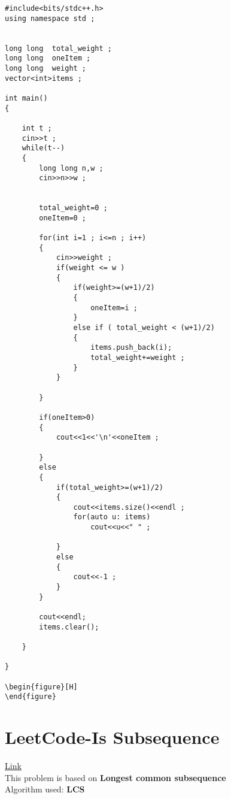 \documentclass{article}
\begin{document}
\begin{lstlisting}[style=cppStyle]
#include<bits/stdc++.h>
using namespace std ;


long long  total_weight ;
long long  oneItem ;
long long  weight ;
vector<int>items ;

int main()
{

    int t ;
    cin>>t ;
    while(t--)
    {
        long long n,w ;
        cin>>n>>w ;


        total_weight=0 ;
        oneItem=0 ;

        for(int i=1 ; i<=n ; i++)
        {
            cin>>weight ;
            if(weight <= w )
            {
                if(weight>=(w+1)/2)
                {
                    oneItem=i ;
                }
                else if ( total_weight < (w+1)/2)
                {
                    items.push_back(i);
                    total_weight+=weight ;
                }
            }

        }

        if(oneItem>0)
        {
            cout<<1<<'\n'<<oneItem ;

        }
        else
        {
            if(total_weight>=(w+1)/2)
            {
                cout<<items.size()<<endl ;
                for(auto u: items)
                    cout<<u<<" " ;

            }
            else
            {
                cout<<-1 ;
            }
        }

        cout<<endl;
        items.clear();

    }

}

\begin{figure}[H]
\end{figure}
\end{lstlisting}

\section{LeetCode-Is Subsequence } \href{https://leetcode.com/problems/is-subsequence/description/}{Link} \\

This problem is based on  \textbf{ Longest common subsequence  }\\
Algorithm used: \textbf{LCS}\\
\end{document}
